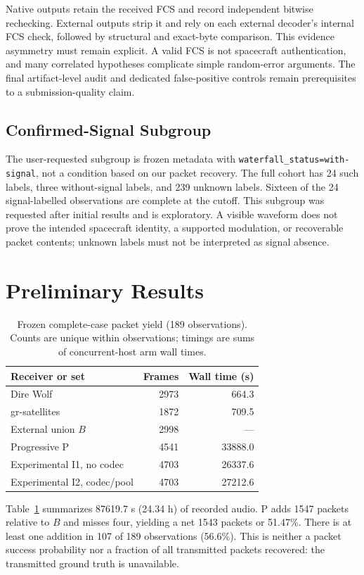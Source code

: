 \documentclass{ieeeaccess}
\begin{document}
Native outputs retain the received FCS and record independent bitwise rechecking. External outputs strip it and rely on each external decoder's internal FCS check, followed by structural and exact-byte comparison. This evidence asymmetry must remain explicit. A valid FCS is not spacecraft authentication, and many correlated hypotheses complicate simple random-error arguments. The final artifact-level audit and dedicated false-positive controls remain prerequisites to a submission-quality claim.

\subsection{Confirmed-Signal Subgroup}
The user-requested subgroup is frozen metadata with \texttt{waterfall\_status=with-signal}, not a condition based on our packet recovery. The full cohort has 24 such labels, three without-signal labels, and 239 unknown labels. Sixteen of the 24 signal-labelled observations are complete at the cutoff. This subgroup was requested after initial results and is exploratory. A visible waveform does not prove the intended spacecraft identity, a supported modulation, or recoverable packet contents; unknown labels must not be interpreted as signal absence.

\section{Preliminary Results}
\begin{table}[t]
\caption{Frozen complete-case packet yield (189 observations). Counts are unique within observations; timings are sums of concurrent-host arm wall times.}
\label{tab:yield}
\centering\small
\begin{tabular}{lrr}
\toprule Receiver or set & Frames & Wall time (s)\\\midrule
Dire Wolf & 2973 & 664.3\\
gr-satellites & 1872 & 709.5\\
External union $B$ & 2998 & ---\\
Progressive P & 4541 & 33888.0\\
Experimental I1, no codec & 4703 & 26337.6\\
Experimental I2, codec/pool & 4703 & 27212.6\\\bottomrule
\end{tabular}
\end{table}
Table~\ref{tab:yield} summarizes 87619.7 s (24.34 h) of recorded audio. P adds 1547 packets relative to $B$ and misses four, yielding a net 1543 packets or 51.47\%. There is at least one addition in 107 of 189 observations (56.6\%). This is neither a packet success probability nor a fraction of all transmitted packets recovered: the transmitted ground truth is unavailable.
\end{document}
